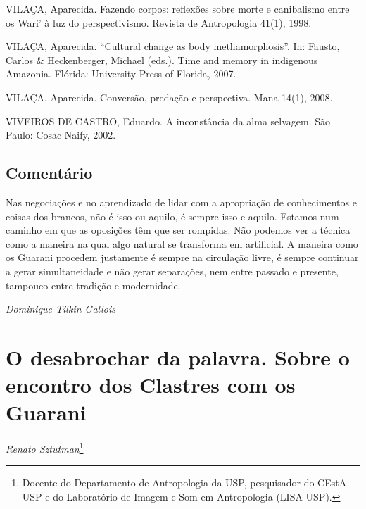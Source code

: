 VILAÇA, Aparecida. Fazendo corpos: reflexões sobre morte e canibalismo
entre os Wari’ à luz do perspectivismo. Revista de Antropologia 41(1),
1998.

VILAÇA, Aparecida. ``Cultural change as body methamorphosis''. In: Fausto,
Carlos \& Heckenberger, Michael (eds.). Time and memory in indigenous
Amazonia. Flórida: University Press of Florida, 2007.

VILAÇA, Aparecida. Conversão, predação e perspectiva. Mana 14(1), 2008.

VIVEIROS DE CASTRO, Eduardo. A inconstância da alma selvagem. São Paulo:
Cosac Naify, 2002.

\section{Comentário}
Nas negociações e no aprendizado de lidar com a apropriação de
conhecimentos e coisas dos brancos, não é isso ou aquilo, é sempre isso
e aquilo. Estamos num caminho em que as oposições têm que ser rompidas.
Não podemos ver a técnica como a maneira na qual algo natural se
transforma em artificial. A maneira como os Guarani procedem justamente
é sempre na circulação livre, é sempre continuar a gerar simultaneidade
e não gerar separações, nem entre passado e presente, tampouco entre
tradição e modernidade.  
\medskip
\begin{flushright}
\emph{Dominique Tilkin Gallois}
\end{flushright}

\chapter{O desabrochar da palavra. Sobre o encontro dos Clastres com os
Guarani}
\begin{flushright}
\emph{Renato Sztutman}\footnote{Docente do Departamento de Antropologia da USP,
pesquisador do CEstA-USP e do Laboratório de Imagem e Som em
Antropologia (LISA-USP).}
\end{flushright}
\medskip

